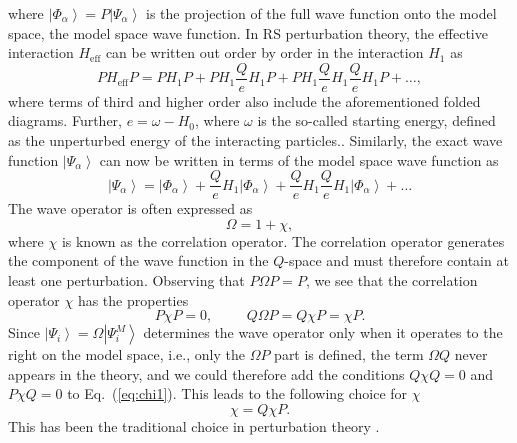 where $\left|\Phi_{\alpha}\right\rangle=P\left|\Psi_{\alpha}\right\rangle$
is the projection of the full wave function
onto the model space, the model space wave function.
In RS perturbation theory, the effective interaction
$H_{\mathrm{eff}}$ can be written out order by order in the 
interaction $H_1$ as
\begin{equation}
               PH_{\mathrm{eff}}P=PH_1P +PH_1\frac{Q}{e}H_1 P+
               PH_1\frac{Q}{e}H_1 \frac{Q}{e}H_1 P+\dots,
               \label{eq:effint}
\end{equation}
where terms of third and higher order also
include the aforementioned folded diagrams. 
Further, $e=\omega -H_0$,
where $\omega$ is the so-called starting energy, defined as the unperturbed
energy of the interacting particles..
Similarly,
the exact wave
function $\left|\Psi_{\alpha}\right\rangle$
can now be written in terms of the model space wave function as
\begin{equation}
                \left|\Psi_{\alpha}\right\rangle=
                \left|\Phi_{\alpha}\right\rangle+
                \frac{Q}{e}H_1\left|\Phi_{\alpha}\right\rangle
                +\frac{Q}{e}H_1\frac{Q}{e}H_1\left|\Phi_{\alpha}\right\rangle
                +\dots
                \label{eq:wavef}
\end{equation}
The wave operator is often expressed as
\begin{equation}
              \Omega = 1 +\chi,
\end{equation}
where $\chi$ is known as the correlation operator. The correlation
operator generates the component of the wave function in the $Q$-space
and must therefore contain at least one perturbation. Observing
that $P\Omega P = P$, we see that the correlation operator $\chi$
has the properties
\begin{equation}
               P\chi P = 0, \hspace{1cm} Q\Omega P = 
              Q\chi P =\chi P. \label{eq:chi1}
\end{equation}
Since  $\left|\Psi_i\right\rangle=\Omega\left|\Psi_i^{M}\right\rangle$ 
determines the wave operator
only when it operates to the right on the model space, i.e., only the
$\Omega P$  part is defined, the term $\Omega Q$
never appears in the theory,
and we could therefore add the conditions $Q\chi Q =0$ and $P\chi Q =0$
to Eq.\ (\ref{eq:chi1}). This leads to the following choice for $\chi$
\begin{equation}
                   \chi = Q\chi P. \label{eq:chi2}
\end{equation}
This has been the traditional choice in perturbation theory \cite{so95,lm85}.

